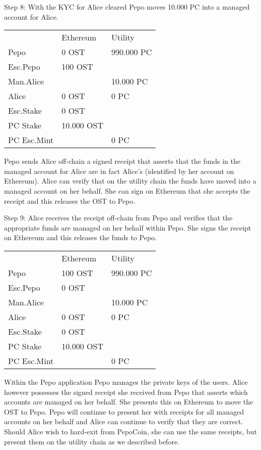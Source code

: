 \documentclass[12pt,a4paper, twocolumn]{article}
\begin{document}
Step 8: With the KYC for Alice cleared Pepo moves 10.000 PC into a managed account for Alice.
\begin{table}[H]
\centering
\label{Step-8}
\begin{tabular}{lll}
    & Ethereum    &   Utility   \\
Pepo        & 0 OST      & 990.000 PC \\
Esc.Pepo    & 100 OST    &            \\
Man.Alice   &            & 10.000 PC  \\
Alice       & 0 OST      & 0 PC       \\
Esc.Stake   & 0 OST      &            \\
PC Stake    & 10.000 OST &            \\
PC Esc.Mint &            & 0 PC
\end{tabular}
\end{table}
Pepo sends Alice off-chain a signed receipt that asserts that the funds in the managed account for Alice are in fact Alice’s (identified by her account on Ethereum).  Alice can verify that on the utility chain the funds have moved into a managed account on her behalf.  She can sign on Ethereum that she accepts the receipt and this releases the OST to Pepo.\par

Step 9: Alice receives the receipt off-chain from Pepo and verifies that the appropriate funds are managed on her behalf within Pepo.  She signs the receipt on Ethereum and this releases the funds to Pepo. 
\begin{table}[H]
\centering
\label{Step-9}
\begin{tabular}{lll}
    & Ethereum    &   Utility   \\
Pepo        & 100 OST    & 990.000 PC \\
Esc.Pepo    & 0 OST      &            \\
Man.Alice   &            & 10.000 PC  \\
Alice       & 0 OST      & 0 PC       \\
Esc.Stake   & 0 OST      &            \\
PC Stake    & 10.000 OST &            \\
PC Esc.Mint &            & 0 PC   
\end{tabular}
\end{table}

Within the Pepo application Pepo manages the private keys of the users.  Alice however possesses the signed receipt she received from Pepo that asserts which accounts are managed on her behalf.  She presents this on Ethereum to move the OST to Pepo.  Pepo will continue to present her with receipts for all managed accounts on her behalf and Alice can continue to verify that they are correct.
Should Alice wish to hard-exit from PepoCoin, she can use the same receipts, but present them on the utility chain as we described before.\par
\end{document}
